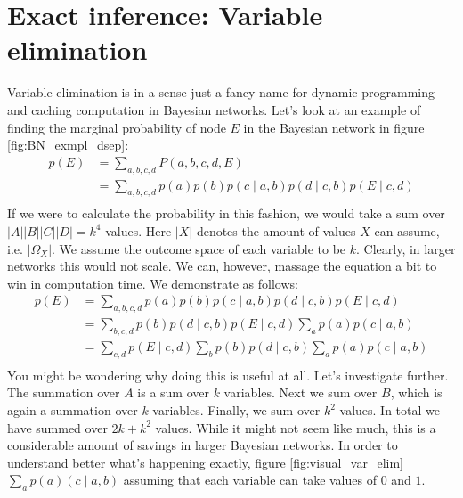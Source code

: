 \section{Exact inference: Variable elimination}
Variable elimination is in a sense just a fancy name for dynamic
programming and caching computation in Bayesian networks. Let's look
at an example of finding the marginal probability of node $E$ in
the Bayesian network in figure \ref{fig:BN_exmpl_dsep}:
\begin{equation}\begin{split}
p(E) 
	&= \sum_{a,b,c,d} P(a, b, c, d, E)\\
	&= \sum_{a,b,c,d} p(a)p(b)p(c \mid a, b)p(d \mid c, b)p(E \mid c, d)\\
\end{split}\end{equation}
If we were to calculate the probability in this fashion, we would
take a sum over $|A||B||C||D| = k^4$ values. Here $|X|$ denotes the
amount of values $X$ can assume, i.e. $|\Omega_X|$. We assume the 
outcome space of each variable to be $k$. Clearly, in larger networks
this would not scale. We can, however, massage the equation a bit 
to win in computation time. We demonstrate as follows:
\begin{equation}\label{eq:var_elim_derv}\begin{split}
p(E) 
	&= \sum_{a,b,c,d} p(a)p(b)p(c \mid a, b)p(d \mid c, b)p(E \mid c, d)\\
	&= \sum_{b,c,d} p(b)p(d \mid c, b)p(E \mid c, d)
			\sum_a p(a)p(c \mid a, b)\\
	&= \sum_{c, d} p(E \mid c, d)\sum_b p(b)p(d \mid c, b)
			\sum_a p(a)p(c \mid a, b)\\
\end{split}\end{equation}
You might be wondering why doing this is useful at all. Let's 
investigate further. The summation over $A$ is a sum over $k$ 
variables. Next we sum over $B$, which is again a summation over
$k$ variables. Finally, we sum over $k^2$ values. In total we
have summed over $2k + k^2$ values. While it might not seem like
much, this is a considerable amount of savings in larger Bayesian 
networks. In order to understand better what's happening exactly,
figure \ref{fig:visual_var_elim} $\sum_a p(a)(c \mid a, b)$ 
assuming that each variable can take values of $0$ and $1$. 
